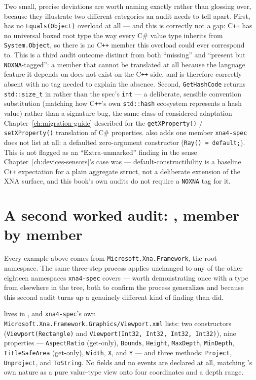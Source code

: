Two small, precise deviations are worth naming exactly rather than glossing over, because they
illustrate two different categories an audit needs to tell apart. First,  has no
\texttt{Equals(Object)} overload at all --- and this is correctly not a gap: C\texttt{++} has no
universal boxed root type the way every C\# value type inherits from \texttt{System.Object}, so
there is no C\texttt{++} member this overload could ever correspond to. This is a third audit
outcome distinct from both ``missing'' and ``present but \texttt{NOXNA}-tagged'': a member that
cannot be translated at all because the language feature it depends on does not exist on the
C\texttt{++} side, and is therefore correctly absent with no tag needed to explain the absence.
Second, \texttt{GetHashCode} returns \texttt{std::size\_t} in  rather than the
spec's \texttt{int} --- a deliberate, sensible convention substitution (matching how
C\texttt{++}'s own \texttt{std::hash} ecosystem represents a hash value) rather than a
signature bug, the same class of considered adaptation Chapter~\ref{ch:migration-guide}
described for the \texttt{getXProperty()} / \texttt{setXProperty()} translation of C\# properties.
 also adds one member \texttt{xna4-spec} does not list at all: a defaulted
zero-argument constructor (\texttt{Ray() = default;}). This is not flagged as an
``Extra-unmarked'' finding in the sense Chapter~\ref{ch:devices-sensors}'s
 case was --- default-constructibility is a baseline C\texttt{++}
expectation for a plain aggregate struct, not a deliberate extension of the XNA surface, and
this book's own audits do not require a \texttt{NOXNA} tag for it.

\section{A second worked audit: , member by member}

Every example above comes from \texttt{Microsoft.Xna.Framework}, the root namespace. The same
three-step process applies unchanged to any of the other eighteen namespaces
\texttt{xna4-spec} covers --- worth demonstrating once with a type from elsewhere in the tree,
both to confirm the process generalizes and because this second audit turns up a genuinely
different kind of finding than  did.

 lives in , and \texttt{xna4-spec}'s
own \texttt{Microsoft.Xna.Framework.Graphics/Viewport.xml} lists: two constructors
(\texttt{Viewport(Rectangle)} and \texttt{Viewport(Int32, Int32, Int32, Int32)}), nine
properties --- \texttt{AspectRatio} (get-only), \texttt{Bounds}, \texttt{Height},
\texttt{MaxDepth}, \texttt{MinDepth}, \texttt{TitleSafeArea} (get-only), \texttt{Width},
\texttt{X}, and \texttt{Y} --- and three methods: \texttt{Project}, \texttt{Unproject}, and
\texttt{ToString}. No fields and no events are declared at all, matching 's
own nature as a pure value-type view onto four coordinates and a depth range.

